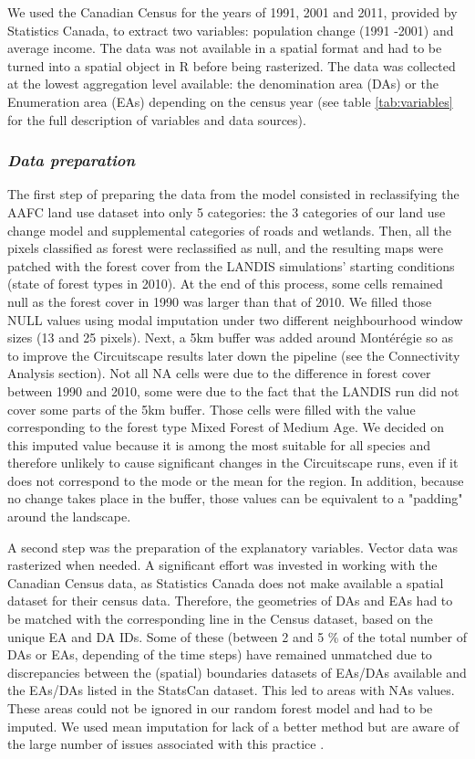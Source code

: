 We used the Canadian Census for the years of 1991, 2001 and 2011, provided by Statistics Canada, to extract two variables: population change (1991 -2001) and average income. The data was not available in a spatial format and had to be turned into a spatial object in R before being rasterized. The data was collected at the lowest aggregation level available: the denomination area (DAs) or the Enumeration area (EAs) depending on the census year (see table \ref{tab:variables} for the full description of variables and data sources).\\

\subsubsection*{\textit{Data preparation}}

The first step of preparing the data from the model consisted in reclassifying the AAFC land use dataset into only 5 categories: the 3 categories of our land use change model and supplemental categories of roads and wetlands. Then, all the pixels classified as forest were reclassified as null, and the resulting maps were patched with the forest cover from the LANDIS simulations' starting conditions (state of forest types in 2010). At the end of this process, some cells remained null as the forest cover in 1990 was larger than that of 2010. We filled those NULL values using modal imputation under two different neighbourhood window sizes (13 and 25 pixels). Next, a 5km buffer was added around Montérégie so as to improve the Circuitscape results later down the pipeline (see the Connectivity Analysis section). Not all NA cells were due to the difference in forest cover between 1990 and 2010, some were due to the fact that the LANDIS run did not cover some parts of the 5km buffer. Those cells were filled with the value corresponding to the forest type Mixed Forest of Medium Age. We decided on this imputed value because it is among the most suitable for all species and therefore unlikely to cause significant changes in the Circuitscape runs, even if it does not correspond to the mode or the mean for the region. In addition, because no change takes place in the buffer, those values can be equivalent to a "padding" around the landscape.

A second step was the preparation of the explanatory variables. Vector data was rasterized when needed. A significant effort was invested in working with the Canadian Census data, as Statistics Canada does not make available a spatial dataset for their census data. Therefore, the geometries of DAs and EAs had to be matched with the corresponding line in the Census dataset, based on the unique EA and DA IDs. Some of these (between 2 and 5 \% of the total number of DAs or EAs, depending of the time steps) have remained unmatched due to discrepancies between the (spatial) boundaries datasets of EAs/DAs available and the EAs/DAs listed in the StatsCan dataset. This led to areas with NAs values. These areas could not be ignored in our random forest model and had to be imputed. We used mean imputation for lack of a better method but are aware of the large number of issues associated with this practice \citep[see][]{lodder_impute_2014}.

